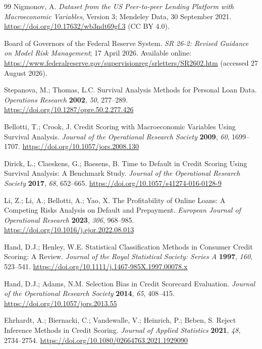 \documentclass[10pt]{article}
\begin{document}
\begin{thebibliography}{99}
Nigmonov, A. \textit{Dataset from the US Peer-to-peer Lending Platform with Macroeconomic Variables}, Version 3; Mendeley Data, 30 September 2021. \url{https://doi.org/10.17632/wb3ndt69gf.3} (CC BY 4.0).

Board of Governors of the Federal Reserve System. \textit{SR 26-2: Revised Guidance on Model Risk Management}; 17 April 2026. Available online: \url{https://www.federalreserve.gov/supervisionreg/srletters/SR2602.htm} (accessed 27 August 2026).

Stepanova, M.; Thomas, L.C. Survival Analysis Methods for Personal Loan Data. \textit{Operations Research} \textbf{2002}, \textit{50}, 277--289. \url{https://doi.org/10.1287/opre.50.2.277.426}

Bellotti, T.; Crook, J. Credit Scoring with Macroeconomic Variables Using Survival Analysis. \textit{Journal of the Operational Research Society} \textbf{2009}, \textit{60}, 1699--1707. \url{https://doi.org/10.1057/jors.2008.130}

Dirick, L.; Claeskens, G.; Baesens, B. Time to Default in Credit Scoring Using Survival Analysis: A Benchmark Study. \textit{Journal of the Operational Research Society} \textbf{2017}, \textit{68}, 652--665. \url{https://doi.org/10.1057/s41274-016-0128-9}

Li, Z.; Li, A.; Bellotti, A.; Yao, X. The Profitability of Online Loans: A Competing Risks Analysis on Default and Prepayment. \textit{European Journal of Operational Research} \textbf{2023}, \textit{306}, 968--985. \url{https://doi.org/10.1016/j.ejor.2022.08.013}


Hand, D.J.; Henley, W.E. Statistical Classification Methods in Consumer Credit Scoring: A Review. \textit{Journal of the Royal Statistical Society: Series A} \textbf{1997}, \textit{160}, 523--541. \url{https://doi.org/10.1111/j.1467-985X.1997.00078.x}

Hand, D.J.; Adams, N.M. Selection Bias in Credit Scorecard Evaluation. \textit{Journal of the Operational Research Society} \textbf{2014}, \textit{65}, 408--415. \url{https://doi.org/10.1057/jors.2013.55}

Ehrhardt, A.; Biernacki, C.; Vandewalle, V.; Heinrich, P.; Beben, S. Reject Inference Methods in Credit Scoring. \textit{Journal of Applied Statistics} \textbf{2021}, \textit{48}, 2734--2754. \url{https://doi.org/10.1080/02664763.2021.1929090}


\end{thebibliography}
\end{document}
